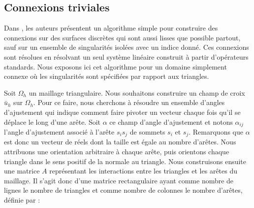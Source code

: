 \subsection{Connexions triviales}

Dans \cite{crane2010trivial}, les auteurs présentent un algorithme simple pour construire des connexions sur des surfaces discrètes qui sont aussi lisses que possible partout, sauf sur un ensemble de singularités isolées avec un indice donné. Ces connexions sont résolues en résolvant un seul système linéaire construit à partir d'opérateurs standards. Nous exposons ici cet algorithme pour un domaine simplement connexe où les singularités sont spécifiées par rapport aux triangles.

Soit $\Omega_h$ un maillage triangulaire. Nous souhaitons construire un champ de croix $\bar{u}_h$ sur $\Omega_h$. Pour ce faire, nous cherchons à résoudre un ensemble d'angles d'ajustement qui indique comment faire pivoter un vecteur chaque fois qu'il se déplace le long d'une arête. Soit $\alpha$ ce champ d'angle d'ajustement et notons $\alpha_{ij}$ l'angle d'ajustement associé à l'arête $s_is_j$ de sommets $s_i$ et $s_j$. Remarquons que $\alpha$ est donc un vecteur de réels dont la taille est égale au nombre d'arêtes. Nous attribuons une orientation arbitraire à chaque arête, puis orientons chaque triangle dans le sens positif de la normale au triangle. Nous construisons ensuite une matrice $A$ représentant les interactions entre les triangles et les arêtes du maillage. Il s'agit donc d'une matrice rectangulaire ayant comme nombre de lignes le nombre de triangles et comme nombre de colonnes le nombre d'arêtes, définie par :

